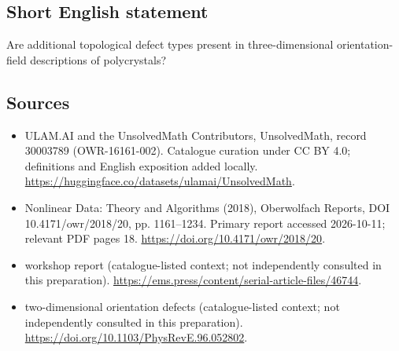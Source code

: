 \documentclass[11pt]{article}
\begin{document}
\subsection{Short English statement}
Are additional topological defect types present in three-dimensional orientation-field descriptions of polycrystals?
\subsection{Sources}
\begin{itemize}
\item[\hypertarget{source:30003789:1}{S1}] ULAM.AI and the UnsolvedMath Contributors, UnsolvedMath, record 30003789 (OWR-16161-002). Catalogue curation under CC BY 4.0; definitions and English exposition added locally.
\url{https://huggingface.co/datasets/ulamai/UnsolvedMath}.
\item[\hypertarget{source:30003789:2}{S2}] Nonlinear Data: Theory and Algorithms (2018), Oberwolfach Reports, DOI 10.4171/owr/2018/20, pp. 1161--1234. Primary report accessed 2026-10-11; relevant PDF pages 18.
\url{https://doi.org/10.4171/owr/2018/20}.
\item[\hypertarget{source:30003789:3}{S3}] workshop report (catalogue-listed context; not independently consulted in this preparation).
\url{https://ems.press/content/serial-article-files/46744}.
\item[\hypertarget{source:30003789:4}{S4}] two-dimensional orientation defects (catalogue-listed context; not independently consulted in this preparation).
\url{https://doi.org/10.1103/PhysRevE.96.052802}.
\end{itemize}
\label{end:30003789}
\end{document}

